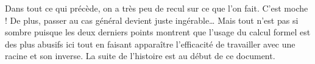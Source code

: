 Dans tout ce qui précède, on a très peu de recul sur ce que l'on fait. C'est moche !
De plus, passer au cas général devient juste ingérable\dots{}
Mais tout n'est pas si sombre puisque les deux derniers points montrent que l'usage du calcul formel est des plus abusifs ici tout en faisant apparaître l'efficacité de travailler avec une racine et son inverse.
La suite de l'histoire est au début de ce document.